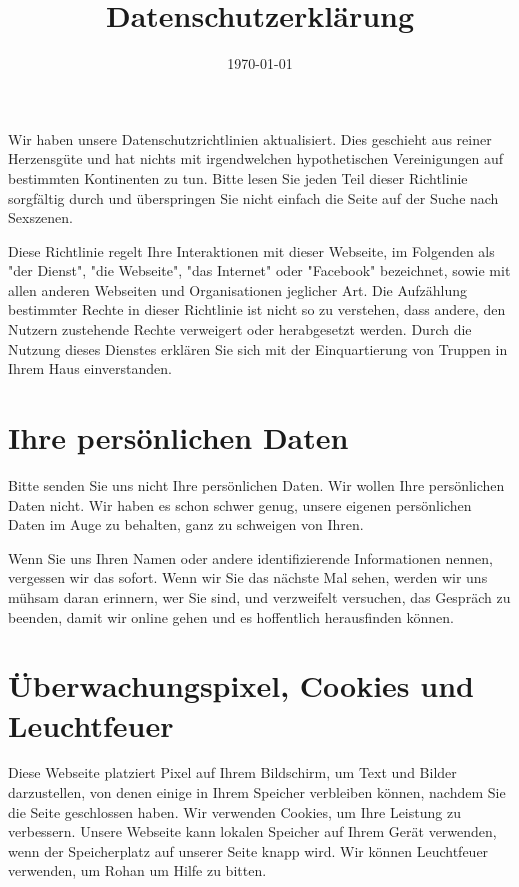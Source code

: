 \documentclass[a4paper, portrait]{tlc-article}
\begin{document}
\title{\vspace{-3cm}Datenschutzerklärung}
\date{\vspace{-1cm}\today}

\maketitle

Wir haben unsere Datenschutzrichtlinien aktualisiert. 
Dies geschieht aus reiner Herzensgüte und hat nichts mit irgendwelchen hypothetischen Vereinigungen auf bestimmten Kontinenten zu tun. 
Bitte lesen Sie jeden Teil dieser Richtlinie sorgfältig durch und überspringen Sie nicht einfach die Seite auf der Suche nach Sexszenen.

Diese Richtlinie regelt Ihre Interaktionen mit dieser Webseite, im Folgenden als "der Dienst", "die Webseite", "das Internet" oder "Facebook" bezeichnet, sowie mit allen anderen Webseiten und Organisationen jeglicher Art. Die Aufzählung bestimmter Rechte in dieser Richtlinie ist nicht so zu verstehen, dass andere, den Nutzern zustehende Rechte verweigert oder herabgesetzt werden. Durch die Nutzung dieses Dienstes erklären Sie sich mit der Einquartierung von Truppen in Ihrem Haus einverstanden.

\section{Ihre persönlichen Daten}

Bitte senden Sie uns nicht Ihre persönlichen Daten. Wir wollen Ihre persönlichen Daten nicht. Wir haben es schon schwer genug, unsere eigenen persönlichen Daten im Auge zu behalten, ganz zu schweigen von Ihren.

Wenn Sie uns Ihren Namen oder andere identifizierende Informationen nennen, vergessen wir das sofort. Wenn wir Sie das nächste Mal sehen, werden wir uns mühsam daran erinnern, wer Sie sind, und verzweifelt versuchen, das Gespräch zu beenden, damit wir online gehen und es hoffentlich herausfinden können.

\section{Überwachungspixel, Cookies und Leuchtfeuer}

Diese Webseite platziert Pixel auf Ihrem Bildschirm, um Text und Bilder darzustellen, von denen einige in Ihrem Speicher verbleiben können, nachdem Sie die Seite geschlossen haben. Wir verwenden Cookies, um Ihre Leistung zu verbessern. Unsere Webseite kann lokalen Speicher auf Ihrem Gerät verwenden, wenn der Speicherplatz auf unserer Seite knapp wird. Wir können Leuchtfeuer verwenden, um Rohan um Hilfe zu bitten.
\end{document}
